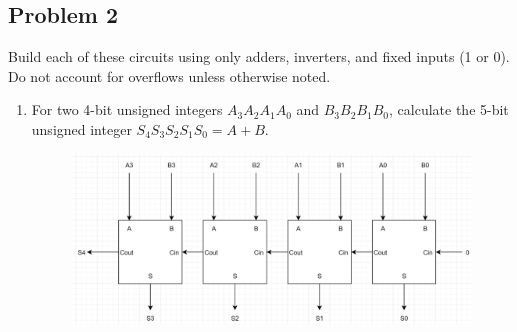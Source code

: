 \documentclass{article}
\begin{document}
\subsection*{Problem 2}
Build each of these circuits using only adders, inverters, and fixed inputs (1 or 0). Do not account for overflows unless otherwise noted.
\begin{enumerate}[label=\alph*.]
    \item For two 4-bit unsigned integers $A_3A_2A_1A_0$ and $B_3B_2B_1B_0$, calculate the 5-bit unsigned integer $S_4S_3S_2S_1S_0 = A + B$. \\
    \begin{figure}[!h]
        \centering
        \includegraphics[width=1\textwidth]{figures/adder2a_solution.png}
    \end{figure}
    

\end{enumerate}
\end{document}
